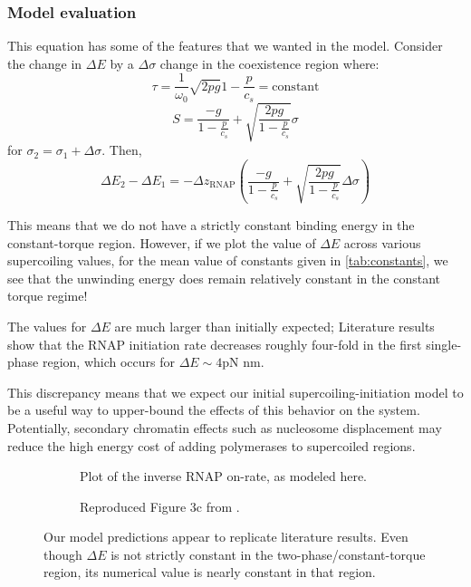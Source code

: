\documentclass[11pt]{article}
\begin{document}
\FloatBarrier
\subsubsection{Model evaluation}
This equation has some of the features that we wanted in the model. Consider the change in \(\Delta E\) by a \(\Delta \sigma\) change in the coexistence region where:
\[\tau = \frac{1}{\omega_0} \sqrt{2pg}{1 - \frac{p}{c_s}} = \text{constant}\]
\[S = \frac{-g}{1 - \frac{p}{c_s}} + \sqrt{\frac{2pg}{1 - \frac{p}{c_s}}} \sigma\]
for \(\sigma_2 = \sigma_1 + \Delta \sigma\). Then,
\[\Delta E_2 - \Delta E_1 = - \Delta z_\text{RNAP} \left( \frac{-g}{1 - \frac{p}{c_s}} + \sqrt{\frac{2pg}{1-\frac{p}{c_s}}} \Delta \sigma\right)\]

This means that we do not have a strictly constant binding energy in the constant-torque region. However, if we plot the value of \(\Delta E\) across various supercoiling values, for the mean value of constants given in \autoref{tab:constants}, we see that the unwinding energy does remain relatively constant in the constant torque regime!

The values for \(\Delta E\) are much larger than initially expected; Literature results show that the RNAP initiation rate decreases roughly four-fold in the first single-phase region, which occurs for \(\Delta E \sim 4 \text{pN nm}\).

This discrepancy means that we expect our initial supercoiling-initiation model to be a useful way to upper-bound the effects of this behavior on the system. Potentially, secondary chromatin effects such as nucleosome displacement may reduce the high energy cost of adding polymerases to supercoiled regions.




\begin{figure}[h]
    \centering
    \begin{subfigure}{.49\linewidth}
        \centering
        \caption{Plot of the inverse RNAP on-rate, as modeled here.}
    \end{subfigure}
    \begin{subfigure}{.49\linewidth}
        \centering
        \caption{Reproduced Figure 3c from \textcite{revyakinPromoterUnwindingPromoter2004}.}
    \end{subfigure}
    \caption{Our model predictions appear to replicate literature results. Even though \(\Delta E\) is not strictly constant in the two-phase/constant-torque region, its numerical value is nearly constant in that region.}
\end{figure}
\end{document}
